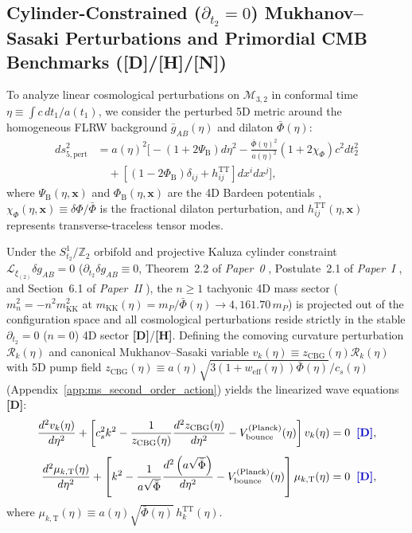 \documentclass[11pt,a4paper]{article}
\newcommand{\catD}{\textbf{\textcolor{blue!75!black}{[D]}}}
\newcommand{\catH}{\textbf{\textcolor{orange!85!black}{[H]}}}
\newcommand{\catN}{\textbf{\textcolor{teal!75!black}{[N]}}}
\theoremstyle{plain}
\theoremstyle{definition}
\theoremstyle{remark}
\numberwithin{equation}{section}
\begin{document}
\subsection{\texorpdfstring{Cylinder-Constrained ($\partial_{t_2} = 0$) Mukhanov--Sasaki Perturbations and Primordial CMB Benchmarks (\catD/\catH/\catN)}{Cylinder-Constrained Mukhanov-Sasaki Perturbations and Primordial CMB Benchmarks ([D]/[H]/[N])}}

To analyze linear cosmological perturbations on $\mathcal{M}_{3,2}$ in conformal time $\eta \equiv \int c\,dt_1 / a(t_1)$, we consider the perturbed 5D metric around the homogeneous FLRW background $\bar{g}_{AB}(\eta)$ and dilaton $\bar{\Phi}(\eta)$:
\begin{align}
ds_{5,\text{pert}}^2 &= a(\eta)^2 \biggl[ -\left(1 + 2\Psi_{\text{B}}\right) d\eta^2 - \frac{\bar{\Phi}(\eta)^2}{a(\eta)^2}\left(1 + 2\chi_{\Phi}\right) c^2 dt_2^2 \nonumber \\[3pt]
&\quad + \left[ \left(1 - 2\Phi_{\text{B}}\right)\delta_{ij} + h_{ij}^{\text{TT}} \right] dx^i dx^j \biggr],
\label{eq:5d_bardeen_metric}
\end{align}
where $\Psi_{\text{B}}(\eta, \mathbf{x})$ and $\Phi_{\text{B}}(\eta, \mathbf{x})$ are the 4D Bardeen potentials \cite{bardeen1980,mukhanov1992}, $\chi_{\Phi}(\eta, \mathbf{x}) \equiv \delta\Phi / \bar{\Phi}$ is the fractional dilaton perturbation, and $h_{ij}^{\text{TT}}(\eta, \mathbf{x})$ represents transverse-traceless tensor modes.

Under the $S^1_{t_2}/\mathbb{Z}_2$ orbifold and projective Kaluza cylinder constraint $\mathcal{L}_{\xi_{(2)}}\delta g_{AB} = 0$ ($\partial_{t_2}\delta g_{AB} \equiv 0$, Theorem~2.2 of \textit{Paper~0} \cite{jimenez2026_p0}, Postulate~2.1 of \textit{Paper~I} \cite{jimenez2026a}, and Section~6.1 of \textit{Paper~II} \cite{jimenez2026b}), the $n \ge 1$ tachyonic 4D mass sector ($m_n^2 = -n^2 m_{\text{KK}}^2$ at $m_{\text{KK}}(\eta) = m_P / \bar{\Phi}(\eta) \to 4{,}161.70\,m_P$) is projected out of the configuration space and all cosmological perturbations reside strictly in the stable $\partial_{t_2} = 0$ ($n = 0$) 4D sector \catD/\catH. Defining the comoving curvature perturbation $\mathcal{R}_k(\eta)$ and canonical Mukhanov--Sasaki variable $v_k(\eta) \equiv z_{\text{CBG}}(\eta)\mathcal{R}_k(\eta)$ with 5D pump field $z_{\text{CBG}}(\eta) \equiv a(\eta)\sqrt{3(1 + w_{\text{eff}}(\eta))\bar{\Phi}(\eta)}/c_s(\eta)$ \cite{mukhanov1981,sasaki1986} (Appendix~\ref{app:ms_second_order_action}) yields the linearized wave equations \catD:
\begin{align}
\frac{d^2 v_k(\eta)}{d\eta^2} + \left[ c_s^2 k^2 - \frac{1}{z_{\text{CBG}}(\eta)}\frac{d^2 z_{\text{CBG}}(\eta)}{d\eta^2} - V_{\text{bounce}}^{\text{(Planck)}}(\eta) \right] v_k(\eta) &= 0 \;\;\catD, \label{eq:master_ms_bitemporal_wave} \\[4pt]
\frac{d^2 \mu_{k,\text{T}}(\eta)}{d\eta^2} + \left[ k^2 - \frac{1}{a\sqrt{\bar{\Phi}}}\frac{d^2\left(a\sqrt{\bar{\Phi}}\right)}{d\eta^2} - V_{\text{bounce}}^{\text{(Planck)}}(\eta) \right] \mu_{k,\text{T}}(\eta) &= 0 \;\;\catD,
\label{eq:master_tensor_wave_cosmo}
\end{align}
where $\mu_{k,\text{T}}(\eta) \equiv a(\eta)\sqrt{\bar{\Phi}(\eta)}\,h_k^{\text{TT}}(\eta)$.
\end{document}
